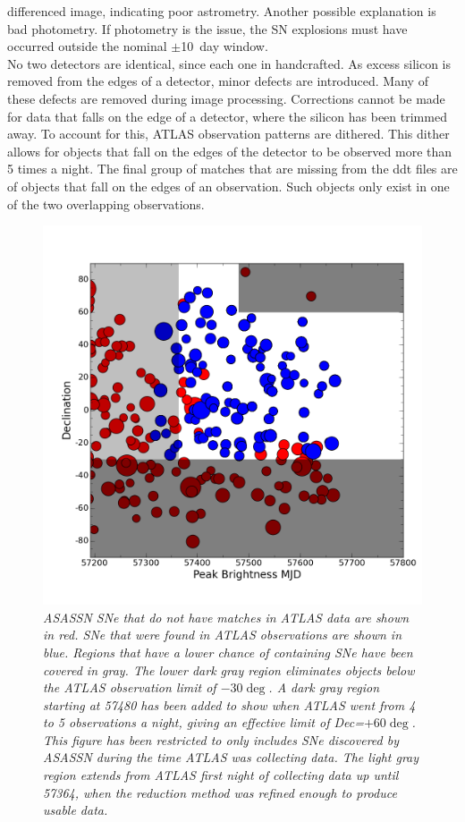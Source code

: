 differenced image, indicating poor astrometry. Another possible explanation is 
bad photometry. If photometry is the issue, the SN explosions must have occurred 
outside the nominal $\pm$10~day window.\\
%
\indent No two detectors are identical, since each one in handcrafted.  
As excess silicon is removed from the 
edges of a detector, minor defects are introduced.  Many of 
these defects are removed during image processing.  Corrections 
cannot be made for data that falls on the edge of a detector, 
where the silicon has been trimmed away.  To account for this, 
ATLAS observation patterns are dithered.  
This dither allows for objects that fall on the edges of the 
detector to be observed more than 5 times a night.  
The final group of matches that are missing from the ddt files 
are of objects that fall on the edges of an observation.  
Such objects only exist in one of the two overlapping observations.

\begin{figure}[h!]%
\begin{center}
    \includegraphics[width=1\linewidth]{figures/plot2useinPaper_restrictxfurther.png}%
     \caption{\it \small{ASASSN SNe that do not have matches in ATLAS data are shown in red.  SNe that were found in ATLAS observations are shown in blue.  Regions that have a lower chance of containing SNe have been covered in gray.  The lower dark gray region eliminates objects below the ATLAS observation limit of $-30\deg$.  A dark gray region starting at 57480 has been added to show when ATLAS went from 4 to 5 observations a night, giving an effective limit of Dec=$+60\deg$.  This figure has been restricted to only includes SNe discovered by ASASSN during the time ATLAS was collecting data.  The light gray region extends from ATLAS first night of collecting data up until 57364, when the reduction method was refined enough to produce usable data.~\label{fig:dec_mjd}}}
  \end{center}
\end{figure}
